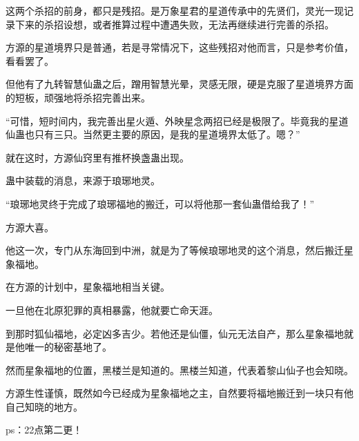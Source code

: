 \begin{this_body}
这两个杀招的前身，都只是残招。是万象星君的星道传承中的先贤们，灵光一现记录下来的杀招设想，或者推算过程中遭遇失败，无法再继续进行完善的杀招。

方源的星道境界只是普通，若是寻常情况下，这些残招对他而言，只是参考价值，看看罢了。

但他有了九转智慧仙蛊之后，蹭用智慧光晕，灵感无限，硬是克服了星道境界方面的短板，顽强地将杀招完善出来。

“可惜，短时间内，我完善出星火遁、外映星念两招已经是极限了。毕竟我的星道仙蛊也只有三只。当然更主要的原因，是我的星道境界太低了。嗯？”

就在这时，方源仙窍里有推杯换盏蛊出现。

蛊中装载的消息，来源于琅琊地灵。

“琅琊地灵终于完成了琅琊福地的搬迁，可以将他那一套仙蛊借给我了！”

方源大喜。

他这一次，专门从东海回到中洲，就是为了等候琅琊地灵的这个消息，然后搬迁星象福地。

在方源的计划中，星象福地相当关键。

一旦他在北原犯罪的真相暴露，他就要亡命天涯。

到那时狐仙福地，必定凶多吉少。若他还是仙僵，仙元无法自产，那么星象福地就是他唯一的秘密基地了。

然而星象福地的位置，黑楼兰是知道的。黑楼兰知道，代表着黎山仙子也会知晓。

方源生性谨慎，既然如今已经成为星象福地之主，自然要将福地搬迁到一块只有他自己知晓的地方。

ps：22点第二更！

\end{this_body}

